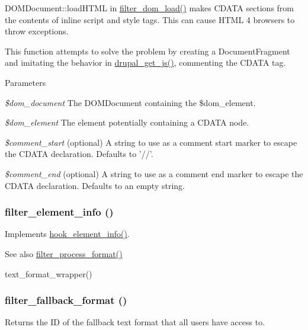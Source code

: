 DOMDocument::loadHTML in \hyperlink{filter_8module_aa7768070b172f41df24931d02c1217fe}{filter\_\-dom\_\-load()} makes CDATA sections from the contents of inline script and style tags. This can cause HTML 4 browsers to throw exceptions.

This function attempts to solve the problem by creating a DocumentFragment and imitating the behavior in \hyperlink{common_8inc_ac4d279ffd40eae67ace8459cd3e6e3b5}{drupal\_\-get\_\-js()}, commenting the CDATA tag.


\begin{DoxyParams}{Parameters}
\item[{\em \$dom\_\-document}]The DOMDocument containing the \$dom\_\-element. \item[{\em \$dom\_\-element}]The element potentially containing a CDATA node. \item[{\em \$comment\_\-start}](optional) A string to use as a comment start marker to escape the CDATA declaration. Defaults to '//'. \item[{\em \$comment\_\-end}](optional) A string to use as a comment end marker to escape the CDATA declaration. Defaults to an empty string. \end{DoxyParams}
\hypertarget{filter_8module_a23474cb2d3629f4e84d3f691e2504a84}{
\subsubsection[{filter\_\-element\_\-info}]{\setlength{\rightskip}{0pt plus 5cm}filter\_\-element\_\-info ()}}
\label{filter_8module_a23474cb2d3629f4e84d3f691e2504a84}
Implements \hyperlink{group__hooks_ga3c5182432eddc82f8b7845e66a365d51}{hook\_\-element\_\-info()}.

\begin{DoxySeeAlso}{See also}
\hyperlink{filter_8module_a7d09545c482bcb763bd50529bc00644b}{filter\_\-process\_\-format()} 

text\_\-format\_\-wrapper() 
\end{DoxySeeAlso}
\hypertarget{filter_8module_a8e7d56dc990c1c1e54b296ddb74bcdcd}{
\subsubsection[{filter\_\-fallback\_\-format}]{\setlength{\rightskip}{0pt plus 5cm}filter\_\-fallback\_\-format ()}}
\label{filter_8module_a8e7d56dc990c1c1e54b296ddb74bcdcd}
Returns the ID of the fallback text format that all users have access to.

